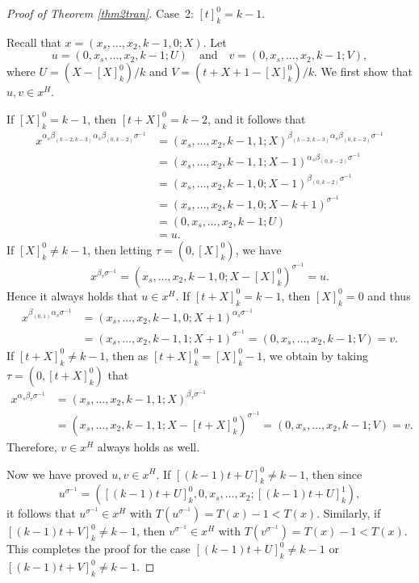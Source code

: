 \documentclass[11pt,a4paper,reqno]{amsart}
\theoremstyle{definition}
\begin{document}
\begin{proof}[Proof of Theorem \ref{thm2tran}]
\textsf{Case~2}: $[t]_{k}^{0}=k-1$.

Recall that $x=(x_s,\ldots,x_2,k-1,0;X)$. Let
\[
  u=(0,x_s,\ldots,x_2,k-1;U)\quad \text{and} \quad v=(0,x_s,\ldots,x_2,k-1;V),
\]
where $U=(X-[X]_k^0)/k$ and $V=(t+X+1-[X]_k^0)/k$. We first show that $u,v\in x^H$.

If $[X]_{k}^{0}=k-1$, then $[t+X]_k^0=k-2$, and it follows that
\begin{align*}
  x^{\alpha_s\beta_{(k-2,k-3)}\alpha_s\beta_{(0,k-2)}\sigma^{-1}}
   &= (x_s,\ldots,x_2,k-1,1;X)^{\beta_{(k-2,k-3)}\alpha_s\beta_{(0,k-2)}\sigma^{-1}}\\
   &= (x_s,\ldots,x_2,k-1,1;X-1)^{\alpha_s\beta_{(0,k-2)}\sigma^{-1}}\\
   &= (x_s,\ldots,x_2,k-1,0;X-1)^{\beta_{(0,k-2)}\sigma^{-1}}\\
   &= (x_s,\ldots,x_2,k-1,0;X-k+1)^{\sigma^{-1}}\\
   &= (0,x_s,\ldots,x_2,k-1;U)\\
   &= u.
\end{align*}
 If $[X]_{k}^{0}\neq k-1$, then letting $\tau=(0,[X]_k^0)$, we have
\[
  x^{\beta_{\tau}\sigma^{-1}}= (x_s,\ldots,x_2,k-1,0;X-[X]_k^0)^{\sigma^{-1}}=u.
\]
Hence it always holds that $u\in x^H$. If $[t+X]_{k}^{0}=k-1$, then $[X]_k^0=0$ and thus
\begin{align*}
  x^{\beta_{(0,1)}\alpha_s\sigma^{-1}}&=(x_s,\ldots,x_2,k-1,0;X+1)^{\alpha_s\sigma^{-1}} \\
  &= (x_s,\ldots,x_2,k-1,1;X+1)^{\sigma^{-1}}=(0,x_s,\ldots,x_2,k-1;V)=v.
\end{align*}
 If $[t+X]_{k}^{0}\neq k-1$, then as $[t+X]_k^0=[X]_k^0-1$, we obtain by taking $\tau=(0,[t+X]_k^0)$ that
\begin{align*}
  x^{\alpha_s\beta_{\tau}\sigma^{-1}}
  &= (x_s,\ldots,x_2,k-1,1;X)^{\beta_{\tau}\sigma^{-1}}\\
  &= (x_s,\ldots,x_2,k-1,1;X-[t+X]_k^0)^{\sigma^{-1}}=(0,x_s,\ldots,x_2,k-1;V)=v.
\end{align*}
Therefore, $v\in x^H$ always holds as well.

Now we have proved $u,v \in x^H$. If $[(k-1)t+U]_{k}^{0}\neq k-1$, then since
\[
u^{\sigma^{-1}}=([(k-1)t+U]_{k}^{0},0,x_s,\ldots,x_2;[(k-1)t+U]_{k}^1),
\]
it follows that $u^{\sigma^{-1}}\in x^H$ with $T(u^{\sigma^{-1}})=T(x)-1<T(x)$.
Similarly, if $[(k-1)t+V]_{k}^{0}\neq k-1$, then $v^{\sigma^{-1}}\in x^H$ with $T(v^{\sigma^{-1}})=T(x)-1<T(x)$.
This completes the proof for the case $[(k-1)t+U]_{k}^{0}\ne k-1$ or $[(k-1)t+V]_{k}^{0}\neq k-1$.


\end{proof}
\end{document}
